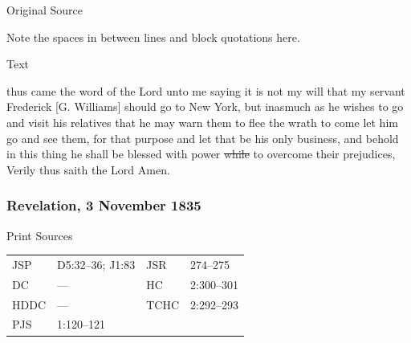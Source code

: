 			\begin{description}
				\item[Original Source]
			\end{description}
			
				
				Note the spaces in between lines and block quotations here.
			
			\begin{description}
				\item[Text]
			\end{description}
			
				thus came the word of the Lord unto me saying it is not my will that my servant Frederick [G. Williams] should go to New York, but inasmuch as he wishes to go and visit his relatives that he may warn them to flee the wrath to come let him go and see them, for that purpose and let that be his only business, and behold in this thing he shall be blessed with power \sout{while} to overcome their prejudices, Verily thus saith the Lord Amen.
				
		\subsubsection{Revelation, 3 November 1835}
			\label{EMS-1835-JS-3-NOV-1835}
			
			\begin{description}
				\item[Print Sources]
			\end{description}

				\begin{tabular}{p{0.5in}p{1in}p{0.5in}p{1in}}
				JSP	 	& D5:32--36; J1:83		& JSR 		& 274--275 \\
				DC	 	& --- 			& HC 		& 2:300--301 \\
				HDDC 	& ---			& TCHC 		& 2:292--293 \\
				PJS 	& 1:120--121			& 	 		&  \\
				\end{tabular}
			
